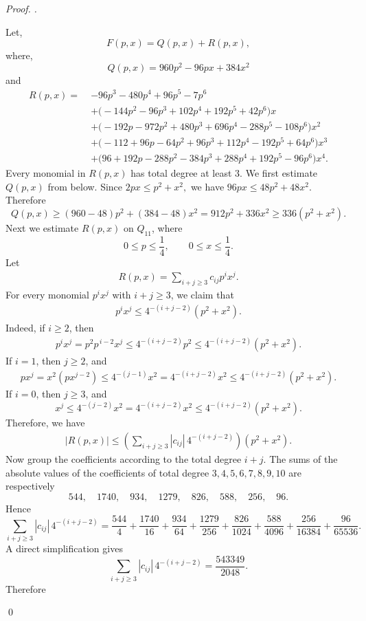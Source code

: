 \documentclass[a4paper,12pt,reqno]{amsart} %
\numberwithin{equation}{section}
\theoremstyle{definition}
\newenvironment{pf}[1][]{%
	\vskip 3mm
	\noindent
	\ifthenelse{\equal{#1}{}}%
	{{\slshape Proof. }}%
	{{\slshape #1.} }%
}%
{\qed\bigskip}
\begin{document}
\begin{pf}
\[\]
Let, 
\[
F(p,x)=Q(p,x)+R(p,x),
\]
where,
\[
Q(p,x)=960p^2-96px+384x^2
\]
and
\[
\begin{aligned}
R(p,x)=\;&-96p^3-480p^4+96p^5-7p^6 \\
&+\bigl(-144p^2-96p^3+102p^4+192p^5+42p^6\bigr)x \\
&+\bigl(-192p-972p^2+480p^3+696p^4-288p^5-108p^6\bigr)x^2 \\
&+\bigl(-112+96p-64p^2+96p^3+112p^4-192p^5+64p^6\bigr)x^3 \\
&+\bigl(96+192p-288p^2-384p^3+288p^4+192p^5-96p^6\bigr)x^4.
\end{aligned}
\]
Every monomial in $R(p, x)$ has total degree at least $3$.
We first estimate $Q(p, x)$ from below. Since
$
2px\le p^2+x^2,
$
we have
$
96px\le 48p^2+48x^2.
$
Therefore
\[
Q(p,x)\ge (960-48)p^2+(384-48)x^2
=912p^2+336x^2
\ge 336(p^2+x^2).
\]
Next we estimate $R(p, x)$ on $Q_{11}$, where
\[
0\le p\le \frac14,\qquad 0\le x\le \frac14.
\]
Let
\begin{align*}
R(p,x)=\sum_{i+j\ge 3} c_{ij}p^i x^j.
\end{align*}
For every monomial $p^i x^j$ with $i+j\ge 3$, we claim that
\begin{align*}
p^i x^j \le 4^{-(i+j-2)}(p^2+x^2).
\end{align*}
Indeed, if \(i\ge 2\), then
\begin{align*}
p^i x^j=p^2 p^{\,i-2}x^j\le 4^{-(i+j-2)}p^2
\le 4^{-(i+j-2)}(p^2+x^2).
\end{align*}
If $i=1$, then $j\ge 2$, and
\begin{align*}
px^j=x^2(px^{j-2})\le 4^{-(j-1)}x^2
=4^{-(i+j-2)}x^2
\le 4^{-(i+j-2)}(p^2+x^2).
\end{align*}
If \(i=0\), then \(j\ge 3\), and
\[
x^j\le 4^{-(j-2)}x^2
=4^{-(i+j-2)}x^2
\le 4^{-(i+j-2)}(p^2+x^2).
\]
Therefore, we have 
\begin{align*}
|R(p,x)|
\le
\left(\sum_{i+j\ge 3}|c_{ij}|\,4^{-(i+j-2)}\right)(p^2+x^2).
\end{align*}
Now group the coefficients according to the total degree \(i+j\).
The sums of the absolute values of the coefficients of total degree
\(3,4,5,6,7,8,9,10\) are respectively
\[
544,\quad 1740,\quad 934,\quad 1279,\quad 826,\quad 588,\quad 256,\quad 96.
\]
Hence
\[
\sum_{i+j\ge 3}|c_{ij}|\,4^{-(i+j-2)}
=
\frac{544}{4}
+\frac{1740}{16}
+\frac{934}{64}
+\frac{1279}{256}
+\frac{826}{1024}
+\frac{588}{4096}
+\frac{256}{16384}
+\frac{96}{65536}.
\]
A direct simplification gives
\[
\sum_{i+j\ge 3}|c_{ij}|\,4^{-(i+j-2)}
=
\frac{543349}{2048}.
\]
Therefore

\end{pf}
\end{document}
